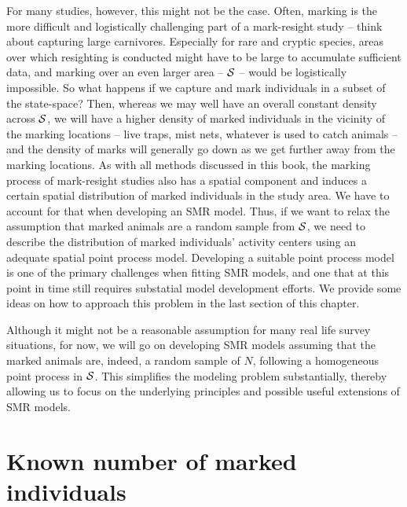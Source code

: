 For many studies, however, this might not be the
case. Often, marking is the more difficult and logistically
challenging part of a mark-resight study -- think about capturing
large carnivores. Especially for rare and cryptic species, areas over
which resighting is conducted might have to be large to accumulate
sufficient data, and marking over an even larger area -- ${\cal S}$ --
would be logistically impossible.
So what happens if we capture and mark individuals in a subset of the
state-space? Then, whereas we may well have an overall constant density
across ${\cal S}$, we will have a higher density of marked individuals in the vicinity of the marking locations -- live
traps, mist nets, whatever is used to catch animals -- and the density of marks will generally go down as we get further away from the marking
locations. As with all methods discussed in this book, the marking process of mark-resight studies also has a spatial component and induces a certain spatial distribution of marked individuals in the study area. We have to account for that when developing an SMR model.
Thus, if we want to relax the assumption that marked animals are a random sample from ${\cal S}$, we need to describe the distribution of marked individuals' activity centers using an adequate spatial
point process model. Developing a suitable point process model is one of the primary
challenges when fitting SMR models, and one that at this point in time
still requires substatial model development efforts.
 We provide some ideas on how to approach this problem in the last section of
this chapter. 

Although it might not be a reasonable assumption for many real life
survey situations, for now, we will go on developing SMR models
assuming that the marked animals are, indeed, a random sample of $N$,
following a homogeneous point process in ${\cal S}$. This simplifies
the modeling problem substantially, thereby allowing us to focus on
the underlying principles and possible useful extensions of SMR
models.





\section{Known number of marked individuals}

